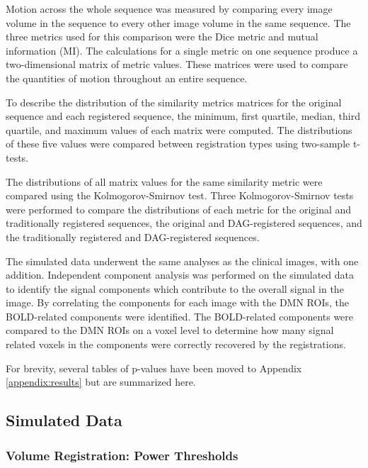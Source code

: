 Motion across the whole sequence was measured by comparing every image volume in the sequence to every other image volume in the same sequence. The three metrics used for this comparison were the Dice metric and mutual information (MI). The calculations for a single metric on one sequence produce a two-dimensional matrix of metric values. These matrices were used to compare the quantities of motion throughout an entire sequence. 

To describe the distribution of the similarity metrics matrices for the original sequence and each registered sequence, the minimum, first quartile, median, third quartile, and maximum values of each matrix were computed. The distributions of these five values were compared between registration types using two-sample t-tests.

The distributions of all matrix values for the same similarity metric were compared using the Kolmogorov-Smirnov test. Three Kolmogorov-Smirnov tests were performed to compare the distributions of each metric for the original and traditionally registered sequences, the original and DAG-registered sequences, and the traditionally registered and DAG-registered sequences.

The simulated data underwent the same analyses as the clinical images, with one addition. Independent component analysis was performed on the simulated data to identify the signal components which contribute to the overall signal in the image. By correlating the components for each image with the DMN ROIs, the BOLD-related components were identified. The BOLD-related components were compared to the DMN ROIs on a voxel level to determine how many signal related voxels in the components were correctly recovered by the registrations.

For brevity, several tables of p-values have been moved to Appendix \ref{appendix:results} but are summarized here.

\subsection{Simulated Data}

\subsubsection{Volume Registration: Power Thresholds}

